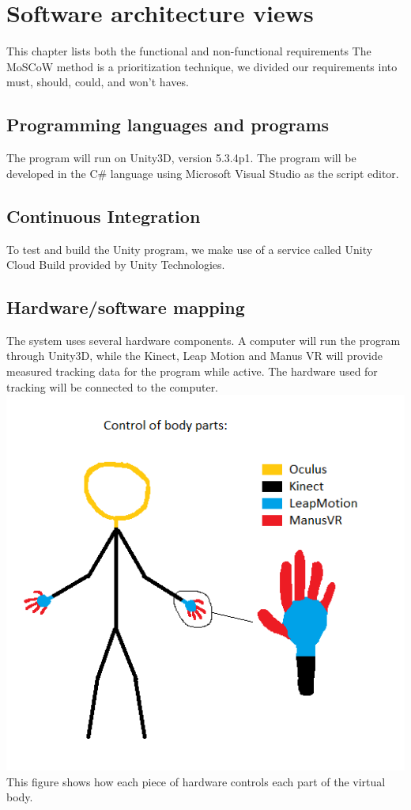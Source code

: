 \documentclass[11pt,a4paper]{report}
\begin{document}
\chapter{ Software architecture views}
This chapter lists both the functional and non-functional requirements
The MoSCoW method is a prioritization technique, we divided our requirements into must, should, could, and won't haves. 
\section{Programming languages and programs}
The program will run on Unity3D, version 5.3.4p1. The program will be developed in the C\#
language using Microsoft Visual Studio as the script editor.
\section{Continuous Integration}
To test and build the Unity program, we make use of a service called Unity Cloud Build
provided by Unity Technologies.
\section{Hardware/software mapping}
The system uses several hardware components. A computer will run the program through
Unity3D, while the Kinect, Leap Motion and Manus VR will provide measured tracking data
for the program while active. The hardware used for tracking will be connected to the
computer.\\
\includegraphics[scale=0.8]{control_of_bodyparts.png}\\
This figure shows how each piece of hardware controls each part of the virtual body.
\end{document}
